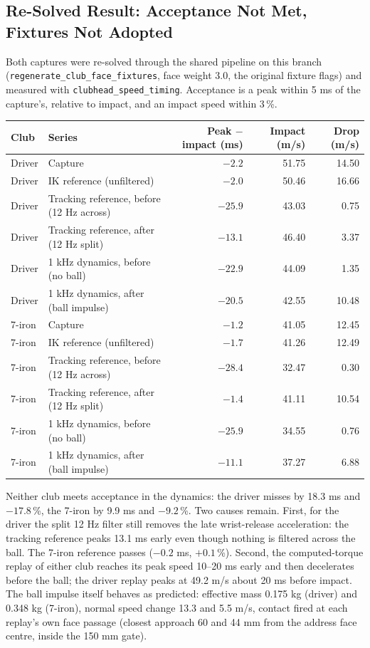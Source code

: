 \documentclass[11pt,a4paper]{article}
\begin{document}
\subsection{Re-Solved Result: Acceptance Not Met, Fixtures Not Adopted}
Both captures were re-solved through the shared pipeline on this branch
(\texttt{regenerate\_club\_face\_fixtures}, face weight 3.0, the original
fixture flags) and measured with \texttt{clubhead\_speed\_timing}. Acceptance
is a peak within 5 ms of the capture's, relative to impact, and an impact
speed within 3\,\%.
\begin{center}
\begin{tabular}{@{}llrrr@{}}
\toprule
Club & Series & Peak $-$ impact (ms) & Impact (m/s) & Drop (m/s) \\
\midrule
Driver & Capture & $-2.2$ & 51.75 & 14.50 \\
Driver & IK reference (unfiltered) & $-2.0$ & 50.46 & 16.66 \\
Driver & Tracking reference, before (12 Hz across) & $-25.9$ & 43.03 & 0.75 \\
Driver & Tracking reference, after (12 Hz split) & $-13.1$ & 46.40 & 3.37 \\
Driver & 1 kHz dynamics, before (no ball) & $-22.9$ & 44.09 & 1.35 \\
Driver & 1 kHz dynamics, after (ball impulse) & $-20.5$ & 42.55 & 10.48 \\
7-iron & Capture & $-1.2$ & 41.05 & 12.45 \\
7-iron & IK reference (unfiltered) & $-1.7$ & 41.26 & 12.49 \\
7-iron & Tracking reference, before (12 Hz across) & $-28.4$ & 32.47 & 0.30 \\
7-iron & Tracking reference, after (12 Hz split) & $-1.4$ & 41.11 & 10.54 \\
7-iron & 1 kHz dynamics, before (no ball) & $-25.9$ & 34.55 & 0.76 \\
7-iron & 1 kHz dynamics, after (ball impulse) & $-11.1$ & 37.27 & 6.88 \\
\bottomrule
\end{tabular}
\end{center}
Neither club meets acceptance in the dynamics: the driver misses by 18.3 ms
and $-17.8$\,\%, the 7-iron by 9.9 ms and $-9.2$\,\%. Two causes remain.
First, for the driver the split 12 Hz filter still removes the late
wrist-release acceleration: the tracking reference peaks 13.1 ms early even
though nothing is filtered across the ball. The 7-iron reference passes
($-0.2$ ms, $+0.1$\,\%). Second, the computed-torque replay of either club
reaches its peak speed 10--20 ms early and then decelerates before the ball;
the driver replay peaks at 49.2 m/s about 20 ms before impact. The ball
impulse itself behaves as predicted: effective mass 0.175 kg (driver) and
0.348 kg (7-iron), normal speed change 13.3 and 5.5 m/s, contact fired at
each replay's own face passage (closest approach 60 and 44 mm from the
address face centre, inside the 150 mm gate).
\end{document}
